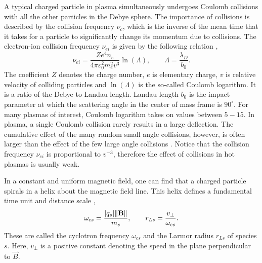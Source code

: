 A typical charged particle in plasma simultaneously undergoes Coulomb collisions with all the other particles in the Debye sphere. The importance of collisions is described by the collision frequency $ \nu_c $, which is the inverse of the mean time that it takes for a particle to significantly change its momentum due to collisions. The electron-ion collision frequency $ \nu_{ei} $ is given by the following relation \cite{nicholson},
\begin{equation}
\label{2.1.6}
\nu_{ei} = \frac{Z e^4 n_e}{4 \pi \varepsilon_0^2 m_e^2 v^3} \ln{\left(\Lambda\right)}, \qquad \Lambda = \frac{\lambda_D}{b_0}.
\end{equation}
The coefficient $ Z $ denotes the charge number, $ e $ is elementary charge, $ v $ is relative velocity of colliding particles and $ \ln{\left(\Lambda\right)} $ is the so-called Coulomb logarithm. It is a ratio of the Debye to Landau length. Landau length $ b_0 $ is the impact parameter at which the scattering angle in the center of mass frame is $ 90^\circ $. For many plasmas of interest, Coulomb logarithm takes on values between $ 5 - 15 $. In plasma, a single Coulomb collision rarely results in a large deflection. The cumulative effect of the many random small angle collisions, however, is often larger than the effect of the few large angle collisions \cite{Chen1984}. Notice that the collision frequency $ \nu_{ei} $ is proportional to $ v^{-3} $, therefore the effect of collisions in hot plasmas is usually weak.

In a constant and uniform magnetic field, one can find that a charged particle spirals in a helix about the magnetic field line. This helix defines a fundamental time unit and distance scale \cite{Chen1984},
\begin{equation}
\label{2.1.7}
\omega_{cs} = \frac{\lvert q_{s}\rvert \lVert\mathbf{B}\rVert}{m_{s}}, \qquad r_{Ls} = \frac{v_\perp}{\omega_{cs}}.
\end{equation}
These are called the cyclotron frequency $ \omega_{cs} $ and the Larmor radius $ r_{Ls} $ of species $ s $. Here, $ v_\perp $ is a positive constant denoting the speed in the plane perpendicular to $ \vec{B} $.
